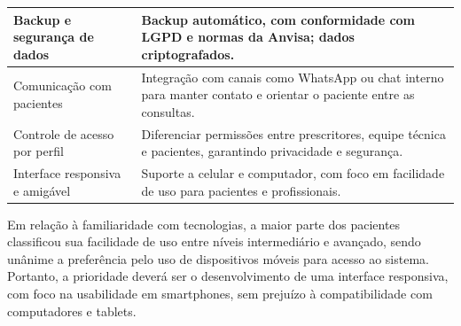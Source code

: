 \href{}{}\documentclass[12pt,portuguese,oneside]{article}
\begin{document}
\begin{table}[H]
\begin{tabularx}{\textwidth}{|>{\raggedright\arraybackslash}p{4.2cm}|>{\raggedright\arraybackslash}X|}
\hline
Backup e segurança de dados & Backup automático, com conformidade com LGPD e normas da Anvisa; dados criptografados. \\
\hline
Comunicação com pacientes & Integração com canais como WhatsApp ou chat interno para manter contato e orientar o paciente entre as consultas. \\
\hline
Controle de acesso por perfil & Diferenciar permissões entre prescritores, equipe técnica e pacientes, garantindo privacidade e segurança. \\
\hline
Interface responsiva e amigável & Suporte a celular e computador, com foco em facilidade de uso para pacientes e profissionais. \\
\hline
\end{tabularx}
\end{table}




Em relação à familiaridade com tecnologias, a maior parte dos pacientes classificou sua facilidade de uso entre níveis intermediário e avançado, sendo unânime a preferência pelo uso de dispositivos móveis para acesso ao sistema. Portanto, a prioridade deverá ser o desenvolvimento de uma interface responsiva, com foco na usabilidade em smartphones, sem prejuízo à compatibilidade com computadores e tablets.
\end{document}
